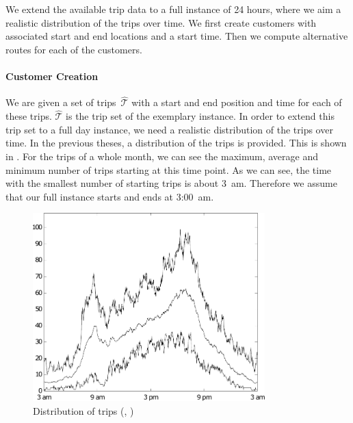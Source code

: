 We extend the available trip data to a full instance of 24 hours, where we aim a realistic distribution of the trips over time. We first create customers with associated start and end locations and a start time. Then we compute alternative routes for each of the customers.

\paragraph{Customer Creation} \parfill

We are given a set of trips~$\widehat{\mathcal{T}}$ with a start and end position and time for each of these trips. $\widehat{\mathcal{T}}$ is the trip set of the exemplary instance. In order to extend this trip set to a full day instance, we need a realistic distribution of the trips over time. In the previous theses, a distribution of the trips is provided. This is shown in . For the trips of a whole month, we can see the maximum, average and minimum number of trips starting at this time point. As we can see, the time with the smallest number of starting trips is about 3~am. Therefore we assume that our full instance starts and ends at 3:00~am.

\begin{figure}[htb]
	\centering
	\includegraphics[width=0.8\textwidth]{graphic/Trip_Distribution}
	\caption{Distribution of trips (\cite[p.~62]{Kaiser}, \cite[p.~62]{Knoll})}
	\label{fig:trip_distribution}
\end{figure}

